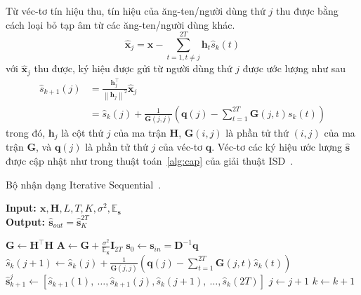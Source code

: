 Từ véc-tơ tín hiệu thu, tín hiệu của ăng-ten/người dùng thứ $j$ thu được bằng cách loại bỏ tạp âm từ các ăng-ten/người dùng khác.
\begin{equation}
    \hat{\mathbf{x}}_j=\mathbf{x}-\sum_{t=1, t \neq j}^{2T} \mathbf{h}_t \hat{s}_k(t)
\end{equation}
với $\hat{\mathbf{x}}_j$ thu được, ký hiệu được gửi từ người dùng thứ $j$ được ước lượng như sau
\begin{equation}
\label{eq:supdate}
    \begin{aligned}
        \hat{s}_{k+1}(j) & =\frac{\mathbf{h}_j^\top}{\left\|\mathbf{h}_j\right\|^2} \hat{\mathbf{x}}_j \\ 
        & = \hat{s}_k(j)+\frac{1}{\mathbf{G}(j, j)}\left(\mathbf{q}(j)-\sum_{t=1}^{2T} \mathbf{G}(j, t) s_k(t)\right)
    \end{aligned}
\end{equation}
trong đó, $\mathbf{h}_j$ là cột thứ $j$ của ma trận $\mathbf{H}$, $\mathbf{G}(i, j)$ là phần tử thứ $(i, j)$ của ma trận $\mathbf{G}$, và $\mathbf{q}(j)$ là phần tử thứ $j$ của véc-tơ $\mathbf{q}$. Véc-tơ các ký hiệu ước lượng $\hat{\mathbf{s}}$ được cập nhật như trong thuật toán~\ref{alg:cap} của giải thuật ISD~\cite{Mandloi2017}. 
\begin{algorithm}[ht]
    \caption{Bộ nhận dạng Iterative Sequential~\cite{Mandloi2017}.}\label{alg:cap}
    \hspace*{\algorithmicindent} \textbf{Input: $\mathbf{x}, \mathbf{H}, L, T, K, \sigma^2, \mathbb{E}_\mathbf{s}$} \\
    \hspace*{\algorithmicindent} \textbf{Output: $\hat{\mathbf{s}}_{out} = \hat{\mathbf{s}}^{2T}_K$} 
    \begin{algorithmic}[1]
        \State $\mathbf{G} \leftarrow \mathbf{H}^\top \mathbf{H}$
        \State $\mathbf{A} \leftarrow \mathbf{G} + \frac{\sigma^2}{\mathbb{E}_\mathbf{x}} \mathbf{I}_{2T}$
        \State $\mathbf{s}_0 \leftarrow \mathbf{s}_{in} = \mathbf{D}^{-1} \mathbf{q}$ \\
                \State $\hat{s}_k(j+1) \leftarrow \hat{s}_k(j)+\frac{1}{\mathbf{G}(j, j)}\left(\mathbf{q}(j)-\sum_{t=1}^{2T} \mathbf{G}(j, t) \hat{s}_k(t)\right)$ \\ 
                \State $\hat{\mathbf{s}}_{k+1}^j \leftarrow\left[\hat{s}_{k+1}(1),~\ldots, \hat{s}_{k+1}(j), \hat{s}_k(j+1),~\ldots, \hat{s}_k(2T)\right]$
                \State $j \leftarrow j + 1$
            \EndFor
            \State $k \leftarrow k + 1$
        \EndFor
    \end{algorithmic}
\end{algorithm}

